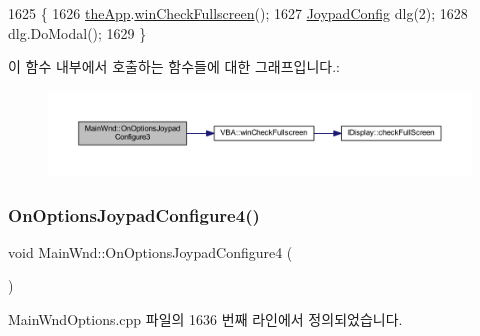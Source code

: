 \begin{DoxyCode}
1625 \{
1626   \mbox{\hyperlink{_v_b_a_8cpp_a8095a9d06b37a7efe3723f3218ad8fb3}{theApp}}.\mbox{\hyperlink{class_v_b_a_a340eaeeb7fcfc242f08ac3442d991a96}{winCheckFullscreen}}();
1627   \mbox{\hyperlink{class_joypad_config}{JoypadConfig}} dlg(2);
1628   dlg.DoModal();
1629 \}
\end{DoxyCode}
이 함수 내부에서 호출하는 함수들에 대한 그래프입니다.\+:
\nopagebreak
\begin{figure}[H]
\begin{center}
\leavevmode
\includegraphics[width=350pt]{class_main_wnd_a0def1429ded1fc96ecdda38a7e5257b8_cgraph}
\end{center}
\end{figure}
\mbox{\label{class_main_wnd_afc6e9e67b71193dca7d906bb62ad259b}} 
\subsubsection{\texorpdfstring{On\+Options\+Joypad\+Configure4()}{OnOptionsJoypadConfigure4()}}
{\footnotesize\ttfamily void Main\+Wnd\+::\+On\+Options\+Joypad\+Configure4 (\begin{DoxyParamCaption}{ }\end{DoxyParamCaption})\hspace{0.3cm}{\ttfamily [protected]}}



Main\+Wnd\+Options.\+cpp 파일의 1636 번째 라인에서 정의되었습니다.



